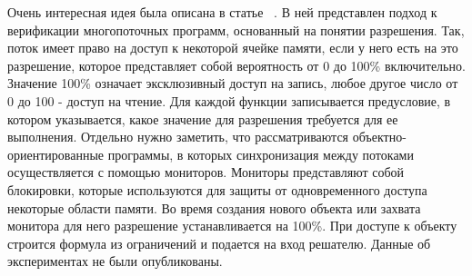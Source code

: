 %
%


Очень интересная идея была описана в статье ~\cite{Leino:2009}. В ней представлен подход к верификации многопоточных программ, основанный на понятии разрешения.
Так, поток имеет право на доступ к некоторой ячейке памяти, если у него есть на это разрешение, которое представляет собой вероятность от 0 до 100\% включительно.
Значение 100\% означает эксклюзивный доступ на запись, любое другое число от 0 до 100 - доступ на чтение.
Для каждой функции записывается предусловие, в котором указывается, какое значение для разрешения требуется для ее выполнения.
Отдельно нужно заметить, что рассматриваются объектно-ориентированные программы, в которых синхронизация между потоками осуществляется с помощью мониторов.
Мониторы представляют собой блокировки, которые используются для защиты от одновременного доступа некоторые области памяти.
Во время создания нового объекта или захвата монитора для него разрешение устанавливается на 100\%.
При доступе к объекту строится формула из ограничений и подается на вход решателю.
Данные об экспериментах не были опубликованы.

